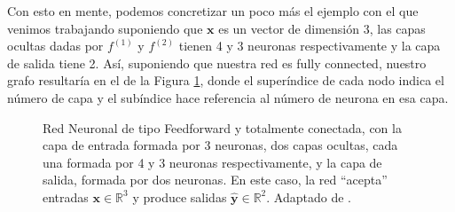 \documentclass[../../main.tex]{subfiles}
\begin{document}
Con esto en mente, podemos concretizar un poco más el ejemplo con el que venimos
trabajando suponiendo que \(\bm{x}\) es un vector de dimensión 3, las capas ocultas dadas
por \(f^{(1)}\) y \(f^{(2)}\) tienen 4 y 3 neuronas respectivamente y la capa de salida
tiene 2. Así, suponiendo que nuestra red es fully connected, nuestro grafo resultaría en
el de la Figura \ref{fig:ff-neural-network}, donde el superíndice de cada nodo indica el
número de capa y el subíndice hace referencia al número de neurona en esa capa.
\begin{figure}
    \centering
    \caption{Red Neuronal de tipo Feedforward y totalmente conectada, con la capa de
    entrada formada por 3 neuronas, dos capas ocultas, cada una formada por 4 y 3 neuronas
    respectivamente, y la capa de salida, formada por dos neuronas. En este caso, la red
    ``acepta'' entradas \(\bm{x} \in \mathbb{R}^3\) y produce salidas \(\bm{\hat{y}} \in
    \mathbb{R}^2\). Adaptado de \cite{tikz-neural-networks}.}
    \label{fig:ff-neural-network}
\end{figure}
\end{document}
